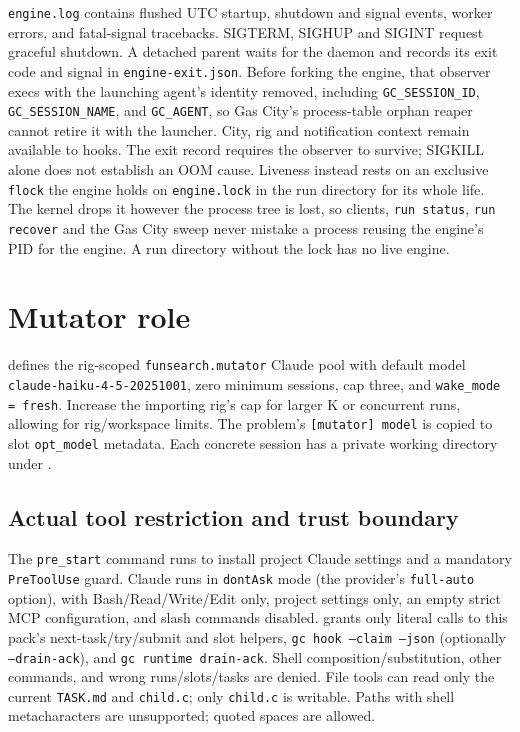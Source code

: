 \documentclass[11pt]{article}
\newcommand{\code}[1]{\texttt{#1}}
\begin{document}
\code{engine.log} contains flushed UTC startup, shutdown and signal events,
worker errors, and fatal-signal tracebacks. SIGTERM, SIGHUP and SIGINT request
graceful shutdown. A detached parent waits for the daemon and records its exit
code and signal in \code{engine-exit.json}. Before forking the engine, that
observer execs with the launching agent's identity removed, including
\code{GC\_SESSION\_ID}, \code{GC\_SESSION\_NAME}, and \code{GC\_AGENT}, so Gas
City's process-table orphan reaper cannot retire it with the launcher.
City, rig and notification context remain available to hooks. The exit record
requires the observer to survive; SIGKILL alone does not establish an OOM cause.
Liveness instead rests on an exclusive \code{flock} the engine holds on
\code{engine.lock} in the run directory for its whole life. The kernel drops it
however the process tree is lost, so clients, \code{run status}, \code{run
recover} and the Gas City sweep never mistake a process reusing the engine's PID
for the engine. A run directory without the lock has no live engine.

\section{Mutator role}
 defines the rig-scoped
\code{funsearch.mutator} Claude pool with default model
\code{claude-haiku-4-5-20251001}, zero minimum sessions, cap three, and
\code{wake\_mode = fresh}. Increase the importing rig's cap for larger K or
concurrent runs, allowing for rig/workspace limits. The problem's
\code{[mutator] model} is copied to slot \code{opt\_model} metadata.
Each concrete session has a private working directory under
.

\subsection{Actual tool restriction and trust boundary}
The \code{pre\_start} command runs  to install
project Claude settings and a mandatory \code{PreToolUse} guard.
Claude runs in \code{dontAsk} mode (the provider's \code{full-auto} option),
with Bash/Read/Write/Edit only, project settings only, an empty strict MCP
configuration, and slash commands disabled. 
grants only literal calls to this pack's next-task/try/submit and slot helpers,
\code{gc hook --claim --json} (optionally \code{--drain-ack}), and
\code{gc runtime drain-ack}. Shell composition/substitution, other commands,
and wrong runs/slots/tasks are denied. File tools can read only the current
\code{TASK.md} and \code{child.c}; only \code{child.c} is writable.
Paths with shell metacharacters are unsupported; quoted spaces are allowed.
\end{document}
